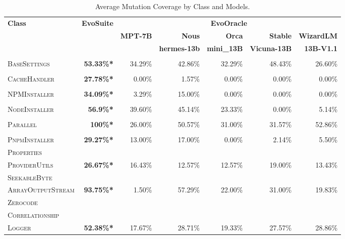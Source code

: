 \begin{table}[H]
\begin{tabular}{| l | r | r | r | r | r | r |}
\hline
\multirow{2}{*}{\textbf{Class}} & \multirow{2}{*}{\textbf{EvoSuite}} & \multicolumn{5}{c|}{\textbf{EvoOracle}} \\ %
\cline{3-7} %
 &  & \textbf{MPT-7B} & \textbf{Nous} & \textbf{Orca} & \textbf{Stable} & \textbf{WizardLM} \\
 &  &  & \textbf{hermes-13b} & \textbf{mini\_13B} & \textbf{Vicuna-13B} & \textbf{13B-V1.1} \\
\hline
\scriptsize\textsc{} &  &  &  &  &  &  \\
\scriptsize\textsc{BaseSettings} & \textbf{53.33\%*} & 34.29\% & 42.86\% & 32.29\% & 48.43\% & 26.60\% \\
\hline
\scriptsize\textsc{} &  &  &  &  &  &  \\
\scriptsize\textsc{CacheHandler} & \textbf{27.78\%*} & 0.00\% & 1.57\% & 0.00\% & 0.00\% & 0.00\% \\
\hline
\scriptsize\textsc{} &  &  &  &  &  &  \\
\scriptsize\textsc{NPMInstaller} & \textbf{34.09\%*} & 3.29\% & 15.00\% & 0.00\% & 0.00\% & 0.00\% \\
\hline
\scriptsize\textsc{} &  &  &  &  &  &  \\
\scriptsize\textsc{NodeInstaller} & \textbf{56.9\%*} & 39.60\% & 45.14\% & 23.33\% & 0.00\% & 5.14\% \\
\hline
\scriptsize\textsc{} &  &  &  &  &  &  \\
\scriptsize\textsc{Parallel} & \textbf{100\%*} & 26.00\% & 50.57\% & 31.00\% & 31.57\% & 52.86\% \\
\hline
\scriptsize\textsc{} &  &  &  &  &  &  \\
\scriptsize\textsc{PnpmInstaller} & \textbf{29.27\%*} & 13.00\% & 17.00\% & 0.00\% & 2.14\% & 5.50\% \\
\hline
\scriptsize\textsc{Properties} &  &  &  &  &  &  \\
\scriptsize\textsc{ProviderUtils} & \textbf{26.67\%*} & 16.43\% & 12.57\% & 12.57\% & 19.00\% & 13.43\% \\
\hline
\scriptsize\textsc{SeekableByte} &  &  &  &  &  &  \\
\scriptsize\textsc{ArrayOutputStream} & \textbf{93.75\%*} & 1.50\% & 57.29\% & 22.00\% & 31.00\% & 19.83\% \\
\hline
\scriptsize\textsc{Zerocode} &  &  &  &  &  &  \\
\scriptsize\textsc{Correlationship} &  &  &  &  &  &  \\
\scriptsize\textsc{Logger} & \textbf{52.38\%*} & 17.67\% & 28.71\% & 19.33\% & 27.57\% & 28.86\% \\
\hline

\end{tabular}
\caption{Average Mutation Coverage by Class and Models.\protect\footnotemark}
\label{tab:mutation_coverage}
\end{table}

